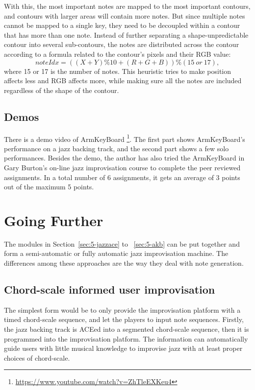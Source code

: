 With this, the most important notes are mapped to the most important contours, and contours with larger areas will contain more notes. But since multiple notes cannot be mapped to a single key, they need to be decoupled  within a contour that has more than one note. Instead of further separating a shape-unpredictable contour into several sub-contours, the notes are distributed across the contour according to a formula related to the contour's pixels and their RGB value:
\begin{equation}
\mathit{noteIdx = ((X + Y) \% 10 + (R + G + B)) \% (15\ or\ 17)},
\end{equation}
where 15 or 17 is the number of notes. This heuristic tries to make position affects less
and RGB affects more, while making sure all the notes are included regardless of the shape of the contour.

\subsection{Demos}
There is a demo video of ArmKeyBoard \footnote{\url{https://www.youtube.com/watch?v=ZhTleEXKeu4}}. The first part shows ArmKeyBoard's performance on a jazz backing track, and the second part shows a few solo performances. Besides the demo, the author has also tried the ArmKeyBoard in Gary Burton's on-line jazz improvisation course \cite{garyburtoncourse} to complete the peer reviewed assignments. In a total number of 6 assignments, it gets an average of 3 points out of the maximum 5 points.


\section{Going Further}\label{sec:5-puttogether}
The modules in Section~\ref{sec:5-jazzace} to ~\ref{sec:5-akb} can be put together and form a semi-automatic or fully automatic jazz improvisation machine. The differences among these approaches are the way they deal with note generation.

\subsection{Chord-scale informed user improvisation}
The simplest form would be to only provide the improvisation platform with a timed chord-scale sequence, and let the players to input note sequences. Firstly, the jazz backing track is ACEed into a segmented chord-scale sequence, then it is programmed into the improvisation platform. The information can automatically guide users with little musical knowledge to improvise jazz with at least proper choices of chord-scale.

